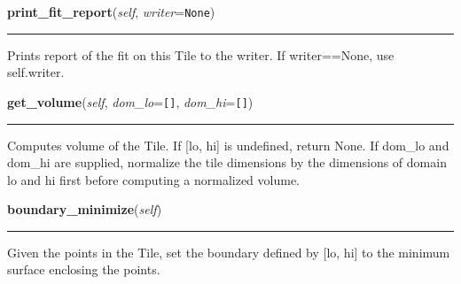     \label{Tiling:Tile:print_fit_report}

    \vspace{0.5ex}

\hspace{.8\funcindent}\begin{boxedminipage}{\funcwidth}

    \raggedright \textbf{print\_fit\_report}(\textit{self}, \textit{writer}={\tt None})

    \vspace{-1.5ex}

    \rule{\textwidth}{0.5\fboxrule}
\setlength{\parskip}{2ex}
    Prints report of the fit on this Tile to the writer. If writer==None, 
    use self.writer.

\setlength{\parskip}{1ex}
    \end{boxedminipage}

    \label{Tiling:Tile:get_volume}

    \vspace{0.5ex}

\hspace{.8\funcindent}\begin{boxedminipage}{\funcwidth}

    \raggedright \textbf{get\_volume}(\textit{self}, \textit{dom\_lo}={\tt []}, \textit{dom\_hi}={\tt []})

    \vspace{-1.5ex}

    \rule{\textwidth}{0.5\fboxrule}
\setlength{\parskip}{2ex}
    Computes volume of the Tile. If [lo, hi] is undefined, return None. If 
    dom\_lo and dom\_hi are supplied, normalize the tile dimensions by the 
    dimensions of domain lo and hi first before computing a normalized 
    volume.

\setlength{\parskip}{1ex}
    \end{boxedminipage}

    \label{Tiling:Tile:boundary_minimize}

    \vspace{0.5ex}

\hspace{.8\funcindent}\begin{boxedminipage}{\funcwidth}

    \raggedright \textbf{boundary\_minimize}(\textit{self})

    \vspace{-1.5ex}

    \rule{\textwidth}{0.5\fboxrule}
\setlength{\parskip}{2ex}
    Given the points in the Tile, set the boundary defined by [lo, hi] to 
    the minimum surface enclosing the points.

\setlength{\parskip}{1ex}
    \end{boxedminipage}

